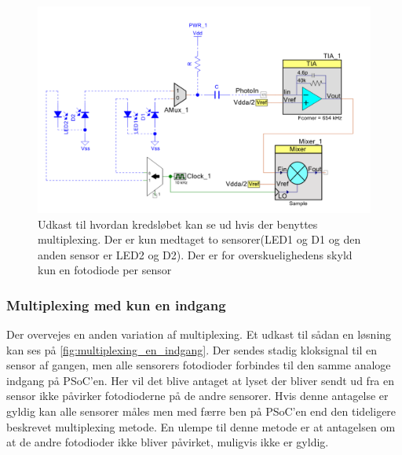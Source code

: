 \documentclass[HardwareDesign/HardwareDesign_main.tex]{subfiles}
\begin{document}
\begin{figure}[H]
    \centering
    \includegraphics[width=1\textwidth]{HardwareDesign/CupSensor/graphics/Multiplexing.PNG}
    \caption{Udkast til hvordan kredsløbet kan se ud hvis der benyttes multiplexing. Der er kun medtaget to sensorer(LED1 og D1 og den anden sensor er LED2 og D2). Der er for overskuelighedens skyld kun en fotodiode per sensor}
    \label{fig:multiplexing}
\end{figure}

\subsubsection{Multiplexing med kun en indgang}
Der overvejes en anden variation af multiplexing. Et udkast til sådan en løsning kan ses på \ref{fig:multiplexing_en_indgang}. Der sendes stadig kloksignal til en sensor af gangen, men alle sensorers fotodioder forbindes til den samme analoge indgang på PSoC'en. Her vil det blive antaget at lyset der bliver sendt ud fra en sensor ikke påvirker fotodioderne på de andre sensorer. Hvis denne antagelse er gyldig kan alle sensorer måles men med færre ben på PSoC'en end den tideligere beskrevet multiplexing metode. En ulempe til denne metode er at antagelsen om at de andre fotodioder ikke bliver påvirket, muligvis ikke er gyldig.
\end{document}
